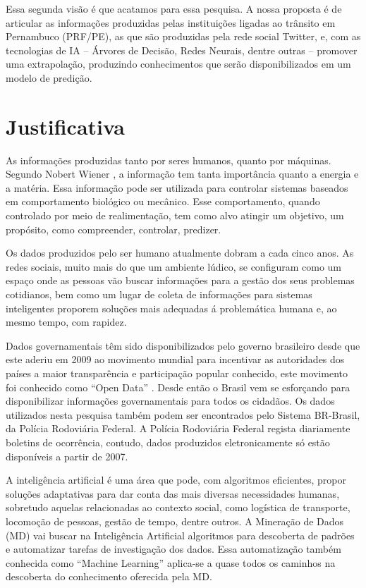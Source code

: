 Essa segunda visão é que acatamos para essa pesquisa. A nossa proposta é de articular as informações produzidas pelas instituições ligadas ao trânsito em Pernambuco (PRF/PE), as que são produzidas pela rede social Twitter, e, com as tecnologias de IA -- Árvores de Decisão, Redes Neurais, dentre outras -- promover uma extrapolação, produzindo conhecimentos que serão disponibilizados em um modelo de predição.

\section{Justificativa}

As informações produzidas tanto por seres humanos, quanto por máquinas. Segundo Nobert Wiener \cite{Salles2007}, a informação tem tanta importância quanto a energia e a matéria. Essa informação pode ser utilizada para controlar sistemas baseados em comportamento biológico ou mecânico. Esse comportamento, quando controlado por meio de realimentação, tem como alvo atingir um objetivo, um propósito, como compreender, controlar, predizer.

Os dados produzidos pelo ser humano atualmente dobram a cada cinco anos. As redes sociais, muito mais do que um ambiente lúdico, se configuram como um espaço onde as pessoas vão buscar informações para a gestão dos seus problemas cotidianos, bem como um lugar de coleta de informações para sistemas inteligentes proporem soluções mais adequadas á problemática humana e, ao mesmo tempo, com rapidez.

Dados governamentais têm sido disponibilizados pelo governo brasileiro desde que este aderiu em 2009 ao movimento mundial para incentivar as autoridades dos países a maior transparência e participação popular conhecido, este movimento foi conhecido como ``Open Data'' \cite{DadosGoverno}. Desde então o Brasil vem se esforçando para disponibilizar informações governamentais para todos os cidadãos. Os dados utilizados nesta pesquisa também podem ser encontrados pelo Sistema BR-Brasil, da Polícia Rodoviária Federal. A Polícia Rodoviária Federal regista diariamente boletins de ocorrência, contudo, dados produzidos eletronicamente só estão disponíveis a partir de 2007.

A inteligência artificial é uma área que pode, com algoritmos eficientes, propor soluções adaptativas para dar conta das mais diversas necessidades humanas, sobretudo aquelas relacionadas ao contexto social, como logística de transporte, locomoção de pessoas, gestão de tempo, dentre outros. A Mineração de Dados (MD) vai buscar na Inteligência Artificial algoritmos para descoberta de padrões e automatizar tarefas de investigação dos dados. Essa automatização também conhecida como ``Machine Learning'' aplica-se a quase todos os caminhos na descoberta do conhecimento oferecida pela MD.
 
